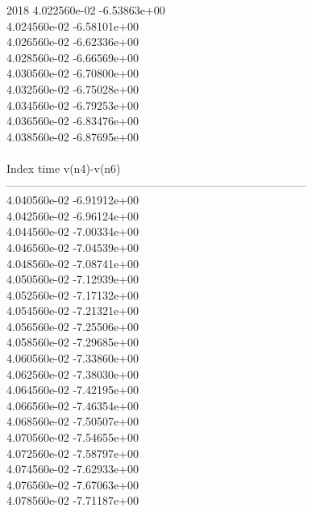 2018	4.022560e-02	-6.53863e+00	\\ 	4.024560e-02	-6.58101e+00	\\ 	4.026560e-02	-6.62336e+00	\\ 	4.028560e-02	-6.66569e+00	\\ 	4.030560e-02	-6.70800e+00	\\ 	4.032560e-02	-6.75028e+00	\\ 	4.034560e-02	-6.79253e+00	\\ 	4.036560e-02	-6.83476e+00	\\ 	4.038560e-02	-6.87695e+00	\\ \hline
\\ \hline
Index   time            v(n4)-v(n6)     \\ \hline
--------------------------------------------------------------------------------\\ 	4.040560e-02	-6.91912e+00	\\ 	4.042560e-02	-6.96124e+00	\\ 	4.044560e-02	-7.00334e+00	\\ 	4.046560e-02	-7.04539e+00	\\ 	4.048560e-02	-7.08741e+00	\\ 	4.050560e-02	-7.12939e+00	\\ 	4.052560e-02	-7.17132e+00	\\ 	4.054560e-02	-7.21321e+00	\\ 	4.056560e-02	-7.25506e+00	\\ 	4.058560e-02	-7.29685e+00	\\ 	4.060560e-02	-7.33860e+00	\\ 	4.062560e-02	-7.38030e+00	\\ 	4.064560e-02	-7.42195e+00	\\ 	4.066560e-02	-7.46354e+00	\\ 	4.068560e-02	-7.50507e+00	\\ 	4.070560e-02	-7.54655e+00	\\ 	4.072560e-02	-7.58797e+00	\\ 	4.074560e-02	-7.62933e+00	\\ 	4.076560e-02	-7.67063e+00	\\ 	4.078560e-02	-7.71187e+00	\\ \hline
